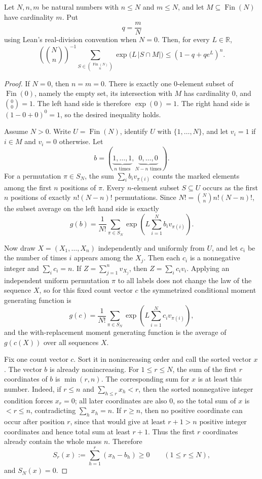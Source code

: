 \begin{helper}
Let \(N,n,m\) be natural numbers with \(n\le N\) and \(m\le N\), and let
\(M\subseteq \operatorname{Fin}(N)\) have cardinality \(m\).  Put
\[
q=\frac{m}{N}
\]
using Lean's real-division convention when \(N=0\).  Then, for every
\(L\in\mathbb R\),
\[
( \binom{N}{n})^{-1}
\sum_{S\in \binom{\operatorname{Fin}(N)}{n}} \exp\!\bigl(L\,|S\cap M|\bigr)
\le (1-q+q e^L)^n .
\]
\end{helper}
\begin{proof}
If \(N=0\), then \(n=m=0\).  There is exactly one \(0\)-element subset of
\(\operatorname{Fin}(0)\), namely the empty set, its intersection with \(M\)
has cardinality \(0\), and \(\binom 00=1\).  The left hand side is therefore
\(\exp(0)=1\).  The right hand side is \((1-0+0)^0=1\), so the desired
inequality holds.

Assume \(N>0\).  Write \(U=\operatorname{Fin}(N)\), identify \(U\) with
\(\{1,\ldots,N\}\), and let \(v_i=1\) if \(i\in M\) and \(v_i=0\) otherwise.
Let
\[
b=(\underbrace{1,\ldots,1}_{n\text{ times}},
  \underbrace{0,\ldots,0}_{N-n\text{ times}}).
\]
For a permutation \(\pi\in S_N\), the sum
\(\sum_i b_i v_{\pi(i)}\) counts the marked elements among the first \(n\)
positions of \(\pi\).  Every \(n\)-element subset \(S\subseteq U\) occurs as
the first \(n\) positions of exactly \(n!(N-n)!\) permutations.  Since
\(N!=\binom Nn n!(N-n)!\), the subset average on the left hand side is
exactly
\[
g(b)=\frac{1}{N!}\sum_{\pi\in S_N}
\exp\!\left(L\sum_{i=1}^N b_i v_{\pi(i)}\right).
\]

Now draw \(X=(X_1,\ldots,X_n)\) independently and uniformly from \(U\), and
let \(c_i\) be the number of times \(i\) appears among the \(X_j\).  Then
each \(c_i\) is a nonnegative integer and \(\sum_i c_i=n\).  If
\(Z=\sum_{j=1}^n v_{X_j}\), then \(Z=\sum_i c_i v_i\).  Applying an
independent uniform permutation \(\pi\) to all labels does not change the law
of the sequence \(X\), so for this fixed count vector \(c\) the symmetrized
conditional moment generating function is
\[
g(c)=\frac{1}{N!}\sum_{\pi\in S_N}
\exp\!\left(L\sum_{i=1}^N c_i v_{\pi(i)}\right),
\]
and the with-replacement moment generating function is the average of
\(g(c(X))\) over all sequences \(X\).

Fix one count vector \(c\).  Sort it in nonincreasing order and call the
sorted vector \(x\).  The vector \(b\) is already nonincreasing.  For
\(1\le r\le N\), the sum of the first \(r\) coordinates of \(b\) is
\(\min(r,n)\).  The corresponding sum for \(x\) is at least this number.
Indeed, if \(r\le n\) and \(\sum_{h\le r}x_h<r\), then the sorted
nonnegative integer condition forces \(x_r=0\); all later coordinates are
also \(0\), so the total sum of \(x\) is \(<r\le n\), contradicting
\(\sum_h x_h=n\).  If \(r\ge n\), then no positive coordinate can occur after
position \(r\), since that would give at least \(r+1>n\) positive integer
coordinates and hence total sum at least \(r+1\).  Thus the first \(r\)
coordinates already contain the whole mass \(n\).  Therefore
\[
S_r(x):=\sum_{h=1}^r(x_h-b_h)\ge0\qquad(1\le r\le N),
\]
and \(S_N(x)=0\).


\end{proof}
